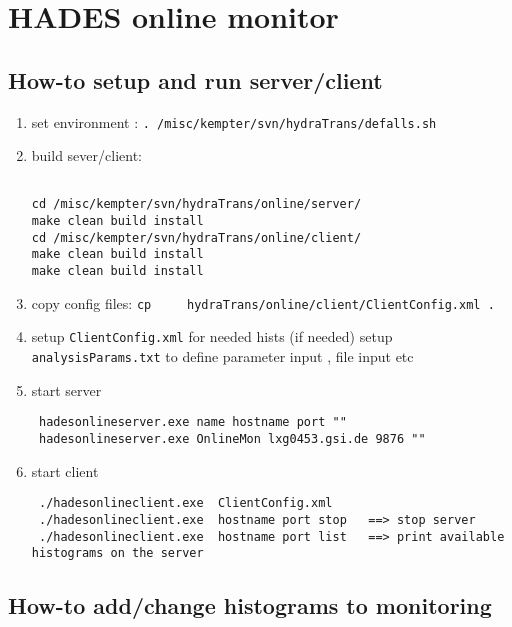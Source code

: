 \chapter{HADES online monitor}

\section{How-to setup and run server/client}

\begin{enumerate}
   \item  set environment : \verb+. /misc/kempter/svn/hydraTrans/defalls.sh+
   \item  build sever/client:
\begin{lstlisting}
   
cd /misc/kempter/svn/hydraTrans/online/server/
make clean build install
cd /misc/kempter/svn/hydraTrans/online/client/
make clean build install
make clean build install
\end{lstlisting}
   \item  copy config files: 
   \newline
   \verb+cp 	hydraTrans/online/client/ClientConfig.xml .+
   \item  setup  \verb+ClientConfig.xml+ for needed hists (if needed)
   \newline
   setup  \verb+analysisParams.txt+ to define parameter input , file input etc
   \item start server
 \begin{lstlisting}
 hadesonlineserver.exe name hostname port ""
 hadesonlineserver.exe OnlineMon lxg0453.gsi.de 9876 ""
 \end{lstlisting}
 \item	start client
 \begin{lstlisting}
 ./hadesonlineclient.exe  ClientConfig.xml
 ./hadesonlineclient.exe  hostname port stop   ==> stop server
 ./hadesonlineclient.exe  hostname port list   ==> print available histograms on the server
 \end{lstlisting}
\end{enumerate}


\section{How-to add/change histograms to monitoring}



